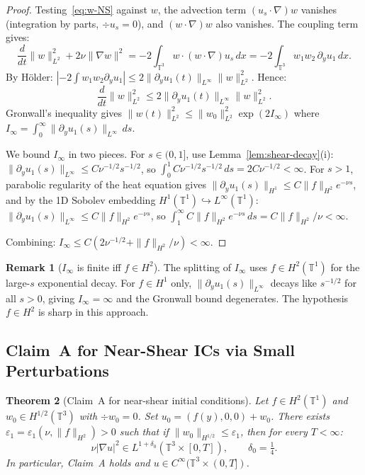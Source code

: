 \documentclass[11pt]{article}
\newtheorem{theorem}{Theorem}[section]
\theoremstyle{definition}
\newtheorem{remark}[theorem]{Remark}
\theoremstyle{remark}
\newcommand{\T}{\mathbb{T}}
\begin{document}
\begin{proof}
  Testing~\eqref{eq:w-NS} against $w$, the advection term $(u_s\cdot\nabla)w$
  vanishes (integration by parts, $\div u_s=0$), and
  $(w\cdot\nabla)w$ also vanishes.  The coupling term gives:
  \[
    \frac{d}{dt}\|w\|_{L^2}^2 + 2\nu\|\nabla w\|^2
    = -2\int_{\T^3}w\cdot(w\cdot\nabla)u_s\,dx
    = -2\int_{\T^3}w_1 w_2\,\partial_y u_1\,dx.
  \]
  By H\"older: $|{-2\int w_1 w_2\partial_y u_1}|\leq 2\|\partial_y u_1(t)\|_{L^\infty}\|w\|_{L^2}^2$.
  Hence:
  \[
    \frac{d}{dt}\|w\|_{L^2}^2 \leq 2\|\partial_y u_1(t)\|_{L^\infty}\|w\|_{L^2}^2.
  \]
  Gronwall's inequality gives $\|w(t)\|_{L^2}^2\leq\|w_0\|_{L^2}^2\exp(2I_\infty)$
  where $I_\infty=\int_0^\infty\|\partial_y u_1(s)\|_{L^\infty}\,ds$.

  We bound $I_\infty$ in two pieces.  For $s\in(0,1]$, use
  Lemma~\ref{lem:shear-decay}(i): $\|\partial_y u_1(s)\|_{L^\infty}\leq C\nu^{-1/2}s^{-1/2}$,
  so $\int_0^1 C\nu^{-1/2}s^{-1/2}\,ds = 2C\nu^{-1/2}<\infty$.
  For $s>1$, parabolic regularity of the heat equation gives
  $\|\partial_y u_1(s)\|_{H^1}\leq C\|f\|_{H^2}e^{-\nu s}$, and by the
  1D Sobolev embedding $H^1(\T^1)\hookrightarrow L^\infty(\T^1)$:
  $\|\partial_y u_1(s)\|_{L^\infty}\leq C\|f\|_{H^2}e^{-\nu s}$, so
  $\int_1^\infty C\|f\|_{H^2}e^{-\nu s}\,ds = C\|f\|_{H^2}/\nu<\infty$.

  Combining: $I_\infty\leq C(2\nu^{-1/2}+\|f\|_{H^2}/\nu)<\infty$.
\end{proof}

\begin{remark}[$I_\infty$ is finite iff $f\in H^2$]
  The splitting of $I_\infty$ uses $f\in H^2(\T^1)$ for the large-$s$
  exponential decay.  For $f\in H^1$ only, $\|\partial_y u_1(s)\|_{L^\infty}$
  decays like $s^{-1/2}$ for all $s>0$, giving $I_\infty=\infty$ and the
  Gronwall bound degenerates.  The hypothesis $f\in H^2$ is sharp in this approach.
\end{remark}

\subsection{Claim~A for Near-Shear ICs via Small Perturbations}
\label{sec:near-shear-claimA}

\begin{theorem}[Claim~A for near-shear initial conditions]
\label{thm:near-shear}
  Let $f\in H^2(\T^1)$ and $w_0\in H^{1/2}(\T^3)$ with $\div w_0=0$.
  Set $u_0=(f(y),0,0)+w_0$.  There exists
  $\varepsilon_1=\varepsilon_1(\nu,\|f\|_{H^2})>0$ such that if
  $\|w_0\|_{H^{1/2}}\leq\varepsilon_1$, then for every $T<\infty$:
  \[
    \nu|\nabla u|^2\in L^{1+\delta_0}(\T^3\times[0,T]),
    \qquad \delta_0=\tfrac{1}{4}.
  \]
  In particular, Claim~A holds and $u\in C^\infty(\T^3\times(0,T])$.
\end{theorem}
\end{document}
